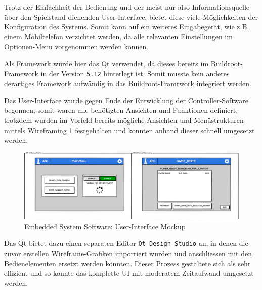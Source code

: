 Trotz der Einfachheit der Bedienung und der meist nur also
Informationsquelle über den Spielstand dienenden User-Interface, bietet
diese viele Möglichkeiten der Konfiguration des Systems. Somit kann auf
ein weiteres Eingabegerät, wie z.B. einem Mobiltelefon verzichtet
werden, da alle relevanten Einstellungen im Optionen-Menu vorgenommen
werden können.

Als Framework wurde hier das Qt\cite{qtframework} verwendet, da
dieses bereits im Buildroot-Framework in der Version
\passthrough{\lstinline!5.12!} hinterlegt ist. Somit musste kein anderes
derartiges Framework aufwändig in das Buildroot-Framrwork integriert
werden.

Das User-Interface wurde gegen Ende der Entwicklung der
Controller-Software begonnen, somit waren alle benötigten Ansichten und
Funktionen definiert, trotzdem wurden im Vorfeld bereits mögliche
Ansichten und Menüstrukturen mittels Wireframing \ref{ATC_Gui}
festgehalten und konnten anhand dieser schnell umgesetzt werden.

\begin{figure}
\centering
\includegraphics{images/ATC_Gui.png}
\caption{Embedded System Software: User-Interface Mockup
\label{ATC_Gui}}
\end{figure}

Das Qt\cite{qtframework} bietet dazu einen separaten Editor
\passthrough{\lstinline!Qt Design Studio!} an, in denen die zuvor
erstellen Wireframe-Grafiken importiert wurden und anschliessen mit den
Bedienelementen ersetzt werden könnten. Dieser Prozess gestaltete sich
als sehr effizient und so konnte das komplette UI mit moderatem
Zeitaufwand umgesetzt werden.

